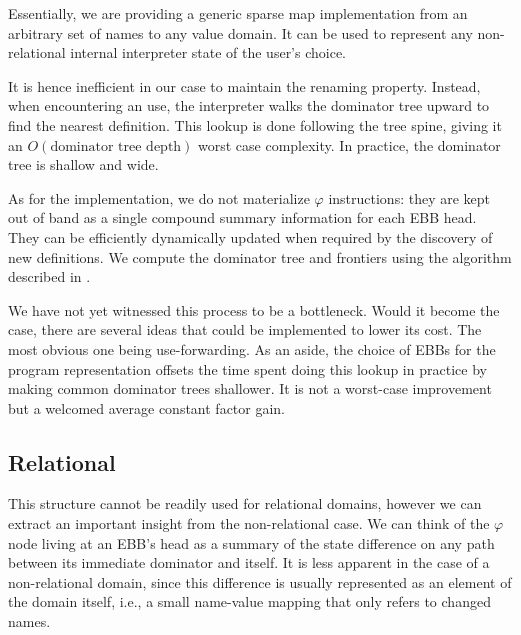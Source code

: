 \documentclass[11pt]{article}
\renewcommand{\phi}{\varphi}
\begin{document}
Essentially, we are providing a generic sparse map implementation from an arbitrary set of names to any value domain.
It can be used to represent any non-relational internal interpreter state of the user's choice.

It is hence inefficient in our case to maintain the renaming property. Instead, when encountering an use, the interpreter walks the dominator tree upward to find the nearest definition.
This lookup is done following the tree spine, giving it an $O(\text{dominator tree depth})$ worst case complexity. In practice, the dominator tree is shallow and wide.

As for the implementation, we do not materialize $\phi$ instructions: they are kept out of band as a single compound summary information for each EBB head.
They can be efficiently dynamically updated when required by the discovery of new definitions.
We compute the dominator tree and frontiers using the algorithm described in \cite{domtree}.

We have not yet witnessed this process to be a bottleneck. Would it become the case, there are several ideas that could be implemented to lower its cost. The most obvious one being use-forwarding.
As an aside, the choice of EBBs for the program representation offsets the time spent doing this lookup in practice by making common dominator trees shallower.
It is not a worst-case improvement but a welcomed average constant factor gain.


\subsection*{Relational}

This structure cannot be readily used for relational domains, however we can extract an important insight from the non-relational case. We can think of the $\phi$ node living at an EBB's head as a summary of the state difference on any path between its immediate dominator and itself. It is less apparent in the case of a non-relational domain, since this difference is usually represented as an element of the domain itself, i.e., a small name-value mapping that only refers to changed names.
\end{document}
